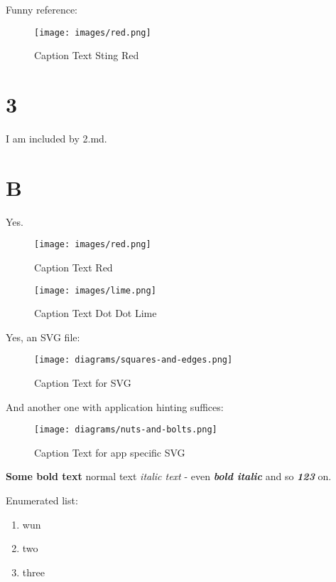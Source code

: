 Funny reference:

\begin{figure}
\centering
\texttt{[image: images/red.png]}
\caption{Caption Text Sting Red \label{fig:red}}
\end{figure}

\hypertarget{section-2}{%
\section{3}\label{section-2}}

I am included by 2.md.

\hypertarget{b}{%
\section{B}\label{b}}

Yes.

\begin{figure}
\centering
\texttt{[image: images/red.png]}
\caption{Caption Text Red \label{fig:red}}
\end{figure}

\begin{figure}
\centering
\texttt{[image: images/lime.png]}
\caption{Caption Text Dot Dot Lime \label{fig:lime}}
\end{figure}

Yes, an SVG file:

\begin{figure}
\centering
\texttt{[image: diagrams/squares-and-edges.png]}
\caption{Caption Text for SVG \label{fig:squares-and-edges}}
\end{figure}

And another one with application hinting suffices:

\begin{figure}
\centering
\texttt{[image: diagrams/nuts-and-bolts.png]}
\caption{Caption Text for app specific SVG \label{fig:nuts-and-bolts}}
\end{figure}

\textbf{Some bold text} normal text \emph{italic text} - even
\emph{\textbf{bold italic}} and so \textbf{\emph{123}} on.

Enumerated list:

\begin{enumerate}
\def\labelenumi{\arabic{enumi}.}
\tightlist
\item
  wun
\item
  two
\item
  three
\end{enumerate}